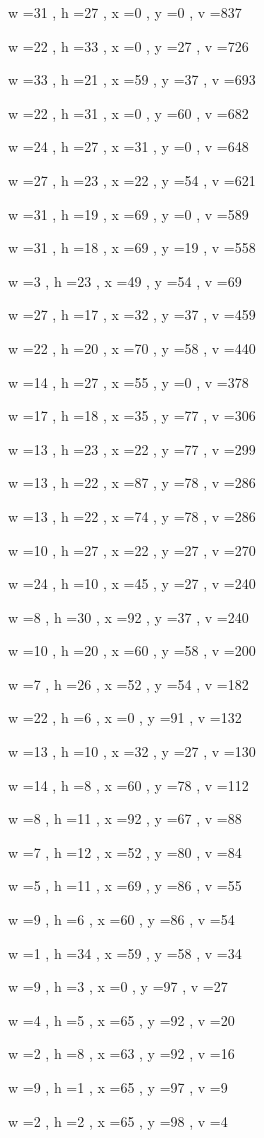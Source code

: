 \documentclass[11pt]{article}
\begin{document}
w =31 , h =27 , x =0 , y =0 , v =837
\par
w =22 , h =33 , x =0 , y =27 , v =726
\par
w =33 , h =21 , x =59 , y =37 , v =693
\par
w =22 , h =31 , x =0 , y =60 , v =682
\par
w =24 , h =27 , x =31 , y =0 , v =648
\par
w =27 , h =23 , x =22 , y =54 , v =621
\par
w =31 , h =19 , x =69 , y =0 , v =589
\par
w =31 , h =18 , x =69 , y =19 , v =558
\par
w =3 , h =23 , x =49 , y =54 , v =69
\par
w =27 , h =17 , x =32 , y =37 , v =459
\par
w =22 , h =20 , x =70 , y =58 , v =440
\par
w =14 , h =27 , x =55 , y =0 , v =378
\par
w =17 , h =18 , x =35 , y =77 , v =306
\par
w =13 , h =23 , x =22 , y =77 , v =299
\par
w =13 , h =22 , x =87 , y =78 , v =286
\par
w =13 , h =22 , x =74 , y =78 , v =286
\par
w =10 , h =27 , x =22 , y =27 , v =270
\par
w =24 , h =10 , x =45 , y =27 , v =240
\par
w =8 , h =30 , x =92 , y =37 , v =240
\par
w =10 , h =20 , x =60 , y =58 , v =200
\par
w =7 , h =26 , x =52 , y =54 , v =182
\par
w =22 , h =6 , x =0 , y =91 , v =132
\par
w =13 , h =10 , x =32 , y =27 , v =130
\par
w =14 , h =8 , x =60 , y =78 , v =112
\par
w =8 , h =11 , x =92 , y =67 , v =88
\par
w =7 , h =12 , x =52 , y =80 , v =84
\par
w =5 , h =11 , x =69 , y =86 , v =55
\par
w =9 , h =6 , x =60 , y =86 , v =54
\par
w =1 , h =34 , x =59 , y =58 , v =34
\par
w =9 , h =3 , x =0 , y =97 , v =27
\par
w =4 , h =5 , x =65 , y =92 , v =20
\par
w =2 , h =8 , x =63 , y =92 , v =16
\par
w =9 , h =1 , x =65 , y =97 , v =9
\par
w =2 , h =2 , x =65 , y =98 , v =4
\par
\newpage
\end{document}
